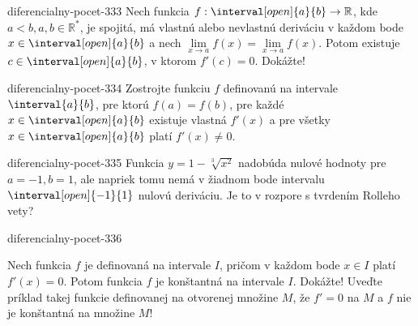 \begin{defproblem}{diferencialny-pocet-333}
Nech funkcia $f:\interval[open]{a}{b}\rightarrow\mathbb{R}$, kde
$a<b,a,b\in\mathbb{R^*}$, je spojitá, má vlastnú alebo nevlastnú deriváciu v
každom bode $x\in \interval[open]{a}{b}$ a nech $\lim\limits_{x\rightarrow
a}f(x)=\lim\limits_{x\rightarrow a}f(x)$. Potom existuje $c\in
\interval[open]{a}{b}$, v ktorom $f'(c)=0$. Dokážte!
\end{defproblem}

\begin{defproblem}{diferencialny-pocet-334}
Zostrojte funkciu $f$ definovanú na intervale $\interval{a}{b}$, pre ktorú
$f(a)=f(b)$, pre každé $x\in \interval[open]{a}{b}$ existuje vlastná $f'(x)$ a
pre všetky $x\in \interval[open]{a}{b}$ platí $f'(x)\neq 0$.
\end{defproblem}

\begin{defproblem}{diferencialny-pocet-335}
Funkcia $y=1-\sqrt[3]{x^2}$ nadobúda nulové hodnoty pre $a=-1,b=1$, ale napriek
tomu nemá v žiadnom bode intervalu $\interval[open]{-1}{1}$ nulovú deriváciu. Je
to v rozpore s tvrdením Rolleho vety?
\end{defproblem}

\begin{defproblem}{diferencialny-pocet-336}
\begin{tasks}
\task
  Nech funkcia $f$ je definovaná na intervale $I$, pričom v každom bode $x\in I$
  platí $f'(x)=0$. Potom funkcia $f$ je konštantná na intervale $I$. Dokážte!
\task
  Uveďte príklad takej funkcie definovanej na otvorenej množine $M$, že $f'=0$
  na $M$ a $f$ nie je konštantná na množine $M$!
\end{tasks}
\end{defproblem}

